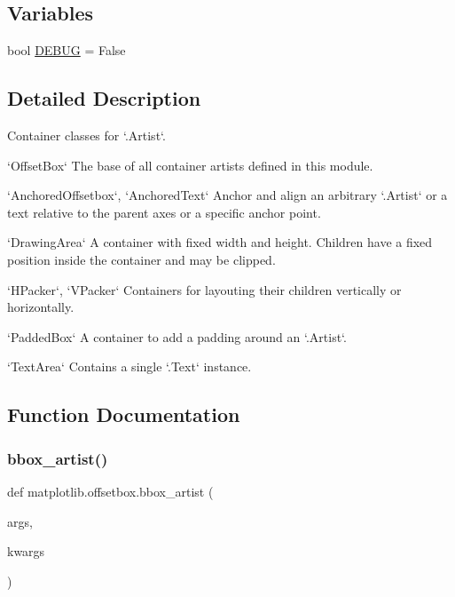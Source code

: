 \subsection*{Variables}
\begin{DoxyCompactItemize}
\item 
bool \hyperlink{namespacematplotlib_1_1offsetbox_a414e63501b67c8dfa2cb4135a58fbf25}{D\+E\+B\+UG} = False
\end{DoxyCompactItemize}


\subsection{Detailed Description}
\begin{DoxyVerb}Container classes for `.Artist`\s.

`OffsetBox`
    The base of all container artists defined in this module.

`AnchoredOffsetbox`, `AnchoredText`
    Anchor and align an arbitrary `.Artist` or a text relative to the parent
    axes or a specific anchor point.

`DrawingArea`
    A container with fixed width and height. Children have a fixed position
    inside the container and may be clipped.

`HPacker`, `VPacker`
    Containers for layouting their children vertically or horizontally.

`PaddedBox`
    A container to add a padding around an `.Artist`.

`TextArea`
    Contains a single `.Text` instance.
\end{DoxyVerb}
 

\subsection{Function Documentation}
\mbox{\label{namespacematplotlib_1_1offsetbox_a65841d2c31f806615ade2c0c75212af7}} 
\subsubsection{\texorpdfstring{bbox\+\_\+artist()}{bbox\_artist()}}
{\footnotesize\ttfamily def matplotlib.\+offsetbox.\+bbox\+\_\+artist (\begin{DoxyParamCaption}\item[{}]{args,  }\item[{}]{kwargs }\end{DoxyParamCaption})}



